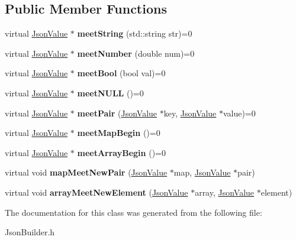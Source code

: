 \subsection*{Public Member Functions}
\begin{DoxyCompactItemize}
\item 
\hypertarget{class_json_builder_a360f25eb3df72b07d7a0f0cad619fc01}{virtual \hyperlink{class_json_value}{Json\-Value} $\ast$ {\bfseries meet\-String} (std\-::string str)=0}\label{class_json_builder_a360f25eb3df72b07d7a0f0cad619fc01}

\item 
\hypertarget{class_json_builder_a5b1161dce599fd377786412427a7bbfd}{virtual \hyperlink{class_json_value}{Json\-Value} $\ast$ {\bfseries meet\-Number} (double num)=0}\label{class_json_builder_a5b1161dce599fd377786412427a7bbfd}

\item 
\hypertarget{class_json_builder_ac8b310cf6ae1f98a3984d647204ae758}{virtual \hyperlink{class_json_value}{Json\-Value} $\ast$ {\bfseries meet\-Bool} (bool val)=0}\label{class_json_builder_ac8b310cf6ae1f98a3984d647204ae758}

\item 
\hypertarget{class_json_builder_a189a522b3de4ac4d93f255edf5362846}{virtual \hyperlink{class_json_value}{Json\-Value} $\ast$ {\bfseries meet\-N\-U\-L\-L} ()=0}\label{class_json_builder_a189a522b3de4ac4d93f255edf5362846}

\item 
\hypertarget{class_json_builder_a570f09a130ba19238ef8fb76c2c50902}{virtual \hyperlink{class_json_value}{Json\-Value} $\ast$ {\bfseries meet\-Pair} (\hyperlink{class_json_value}{Json\-Value} $\ast$key, \hyperlink{class_json_value}{Json\-Value} $\ast$value)=0}\label{class_json_builder_a570f09a130ba19238ef8fb76c2c50902}

\item 
\hypertarget{class_json_builder_ad5fe8e884e409cef76b86d938f9afca5}{virtual \hyperlink{class_json_value}{Json\-Value} $\ast$ {\bfseries meet\-Map\-Begin} ()=0}\label{class_json_builder_ad5fe8e884e409cef76b86d938f9afca5}

\item 
\hypertarget{class_json_builder_a0547b28bac563a3a587071b108e84159}{virtual \hyperlink{class_json_value}{Json\-Value} $\ast$ {\bfseries meet\-Array\-Begin} ()=0}\label{class_json_builder_a0547b28bac563a3a587071b108e84159}

\item 
\hypertarget{class_json_builder_ad09c1859ff1383b1081317f2626079ff}{virtual void {\bfseries map\-Meet\-New\-Pair} (\hyperlink{class_json_value}{Json\-Value} $\ast$map, \hyperlink{class_json_value}{Json\-Value} $\ast$pair)}\label{class_json_builder_ad09c1859ff1383b1081317f2626079ff}

\item 
\hypertarget{class_json_builder_a5bab3a246addf149c3bfd311e5179c11}{virtual void {\bfseries array\-Meet\-New\-Element} (\hyperlink{class_json_value}{Json\-Value} $\ast$array, \hyperlink{class_json_value}{Json\-Value} $\ast$element)}\label{class_json_builder_a5bab3a246addf149c3bfd311e5179c11}

\end{DoxyCompactItemize}


The documentation for this class was generated from the following file\-:\begin{DoxyCompactItemize}
\item 
Json\-Builder.\-h\end{DoxyCompactItemize}
